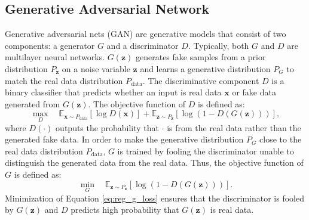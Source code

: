 \documentclass[sigconf]{acmart}
\theoremstyle{definition}
\newtheorem{definition}{Definition}
\begin{document}


\subsection{Generative Adversarial Network}

Generative adversarial nets (GAN) are generative models that consist of two components: a generator $G$ and a discriminator $D$. Typically, both $G$ and $D$ are multilayer neural networks. $G(\mathbf{z})$ generates fake samples from a prior distribution $P_{\mathbf{z}}$ on a noise variable $\mathbf{z}$ and learns a generative distribution $P_G$ to match the real data distribution $P_{\text{data}}$. The discriminative component $D$ is a binary classifier that predicts whether an input is real data $\mathbf{x}$ or fake data generated from $G(\mathbf{z})$. The objective function of $D$ is defined as:
\begin{equation}
\label{eq:reg_d_loss}
\max\limits_D \quad \mathbb{E}_{\mathbf{x} \sim P_{\text{data}}}[\log D(\mathbf{x})] + \mathbb{E}_{\mathbf{z} \sim P_{\mathbf{z}}}[\log(1-D(G(\mathbf{z})))],
\end{equation}
where $D(\cdot)$ outputs the probability that $\cdot$ is from the real data rather than the generated fake data. In order to make the generative distribution $P_G$ close to the real data distribution $P_{\text{data}}$, $G$ is trained by fooling the discriminator unable to distinguish the generated data from the real data. Thus, the objective function of $G$ is defined as:
\begin{equation}
\label{eq:reg_g_loss}
\min\limits_G \quad \mathbb{E}_{\mathbf{z} \sim P_{\mathbf{z}}}[\log(1-D(G(\mathbf{z})))].
\end{equation}
Minimization of Equation \ref{eq:reg_g_loss} ensures that the discriminator is fooled by $G(\mathbf{z})$ and  $D$  predicts high probability that $G(\mathbf{z})$ is real data.
\end{document}
